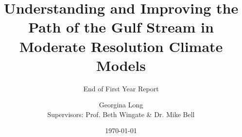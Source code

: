 \documentclass[a4paper,12pt]{article}
\title{Understanding and Improving the Path of the Gulf Stream in Moderate Resolution Climate Models}
\subtitle{End of First Year Report}
\author{Georgina Long \\ Supervisors: Prof. Beth Wingate \& Dr. Mike Bell}
\date{\mydate\today}
\begin{document}
\onehalfspacing
\maketitle


















\end{document}
